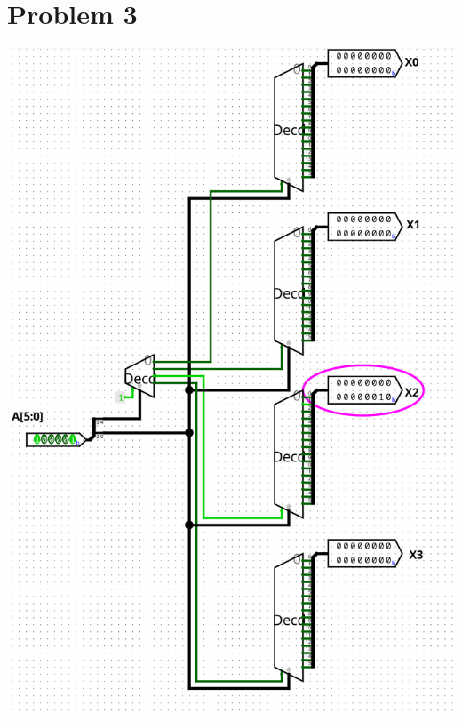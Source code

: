 \documentclass[12pt]{article}
\begin{document}
\section*{Problem 3}
\includegraphics[scale=0.25]{Problem3.png}
\end{document}
